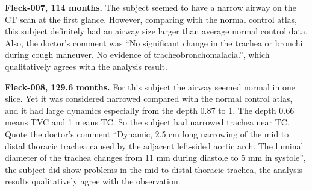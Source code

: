 {\bf Fleck-007, 114 months.}
The subject seemed to have a narrow airway on the CT scan at the first glance.
However, comparing with the normal control atlas, this subject definitely had an airway size larger than average normal control data.
Also, the doctor's comment was ``No significant change in the trachea or bronchi during cough maneuver. No evidence of tracheobronchomalacia.'', which qualitatively agrees with the analysis result.

{\bf Fleck-008, 129.6 months.}
For this subject the airway seemed normal in one slice.
Yet it was considered narrowed compared with the normal control atlas, and it had large dynamics especially from the depth 0.87 to 1.
The depth 0.66 means TVC and 1 means TC.
So the subject had narrowed trachea near TC.
Quote the doctor's comment ``Dynamic, 2.5 cm long narrowing of the mid to distal thoracic trachea caused by the adjacent left-sided aortic arch. The luminal diameter of the trachea changes from 11 mm during diastole to 5 mm in systole'', the subject did show problems in the mid to distal thoracic trachea, the analysis results qualitatively agree with the observation.

